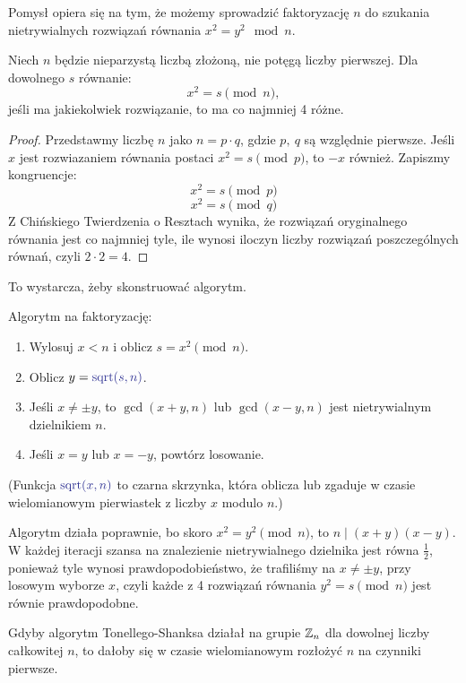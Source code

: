Pomysł opiera się na tym, że możemy sprowadzić faktoryzację \( n \) do szukania nietrywialnych rozwiązań równania \( x^2 = y^2 \mod n \).

\begin{lemma}
	Niech \( n \) będzie nieparzystą liczbą złożoną, nie potęgą liczby pierwszej. Dla dowolnego \( s \) równanie:
	\[
		x^2 = s \pmod{n},
	\]
	jeśli ma jakiekolwiek rozwiązanie, to ma co najmniej 4 różne.
\end{lemma}
\begin{proof}
	Przedstawmy liczbę \( n \) jako \( n = p \cdot q \), gdzie \( p, \ q \) są względnie pierwsze. Jeśli \( x \) jest rozwiazaniem równania postaci \( x^2 = s \pmod{p} \), to \( -x \) również. Zapiszmy kongruencje:
	\[
		x^2 = s \pmod{p}
	\]
	\[
		x^2 = s \pmod{q}
	\]
	Z Chińskiego Twierdzenia o Resztach wynika, że rozwiązań oryginalnego równania jest co najmniej tyle, ile wynosi iloczyn liczby rozwiązań poszczególnych równań, czyli \( 2 \cdot 2 = 4 \).
\end{proof}
To wystarcza, żeby skonstruować algorytm.
\begin{greyframe}
	Algorytm na faktoryzację:
	\begin{enumerate}
		\item Wylosuj \( x < n \) i oblicz \( s = x^2 \pmod{n} \).
		\item Oblicz \( y = \textcolor{Blue}{\text{sqrt}(s, n)} \).
		\item Jeśli \( x \neq \pm y \), to \( \gcd(x + y, n) \) lub \( \gcd(x - y, n) \) jest nietrywialnym dzielnikiem \( n \).
		\item Jeśli \( x = y \) lub \( x = -y \), powtórz losowanie.
	\end{enumerate}
\end{greyframe}
{\small (Funkcja \( \textcolor{Blue}{\text{sqrt}(x, n)} \) to czarna skrzynka, która oblicza lub zgaduje w czasie wielomianowym pierwiastek z liczby \( x \) modulo \( n \).)}

Algorytm działa poprawnie, bo skoro \( x^2 = y^2 \pmod{n} \), to \( n \mid (x + y)(x - y) \). W każdej iteracji szansa na znalezienie nietrywialnego dzielnika jest równa \( \frac{1}{2} \), ponieważ tyle wynosi prawdopodobieństwo, że trafiliśmy na \( x \neq \pm y \), przy losowym wyborze \( x \), czyli każde z 4 rozwiązań równania \( y^2 = s \pmod{n} \) jest równie prawdopodobne.

Gdyby algorytm Tonellego-Shanksa działał na grupie \( \mathbb{Z}_n \) dla dowolnej liczby całkowitej \( n \), to dałoby się w czasie wielomianowym rozłożyć \( n \) na czynniki pierwsze.